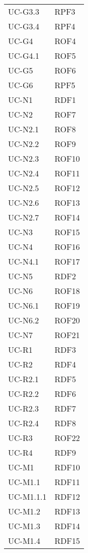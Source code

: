 \begin{longtable}{| p{5cm} | p{5cm} |}
		UC-G3.3 & RPF3 \\
		UC-G3.4 & RPF4 \\
		\rowcolor{LightGray}
		UC-G4 & ROF4 \\
		UC-G4.1 & ROF5 \\
		\rowcolor{LightGray}
		UC-G5 & ROF6 \\
		UC-G6 & RPF5\\
		\rowcolor{LightGray}
		UC-N1 & RDF1\\
		UC-N2 & ROF7  \\
		\rowcolor{LightGray}
		UC-N2.1 & ROF8 \\
		UC-N2.2 & ROF9 \\
		\rowcolor{LightGray}
		UC-N2.3 & ROF10 \\
		UC-N2.4 & ROF11 \\
		\rowcolor{LightGray}
		UC-N2.5 & ROF12 \\
		UC-N2.6 & ROF13 \\
		\rowcolor{LightGray}
		UC-N2.7 & ROF14 \\	
		UC-N3 & ROF15\\	
		\rowcolor{LightGray}
		UC-N4 & ROF16\\
		UC-N4.1 & ROF17\\
		\rowcolor{LightGray}
		UC-N5 & RDF2 \\
		UC-N6 & ROF18 \\
		\rowcolor{LightGray}
		UC-N6.1 & ROF19 \\
		UC-N6.2 & ROF20 \\
		\rowcolor{LightGray}
		UC-N7 & ROF21\\
		UC-R1 & RDF3 \\
		\rowcolor{LightGray}
		UC-R2 & RDF4 \\
		UC-R2.1 & RDF5 \\
		\rowcolor{LightGray}
		UC-R2.2 & RDF6 \\
		UC-R2.3 & RDF7 \\
		\rowcolor{LightGray}
		UC-R2.4 & RDF8 \\
		UC-R3 & ROF22\\
		\rowcolor{LightGray}
		UC-R4 & RDF9 \\
		UC-M1 & RDF10 \\
		\rowcolor{LightGray}
		UC-M1.1 & RDF11\\
		UC-M1.1.1 & RDF12\\
		\rowcolor{LightGray}
		UC-M1.2 & RDF13\\
		UC-M1.3 & RDF14\\
		\rowcolor{LightGray}
		UC-M1.4 & RDF15\\

\end{longtable}

